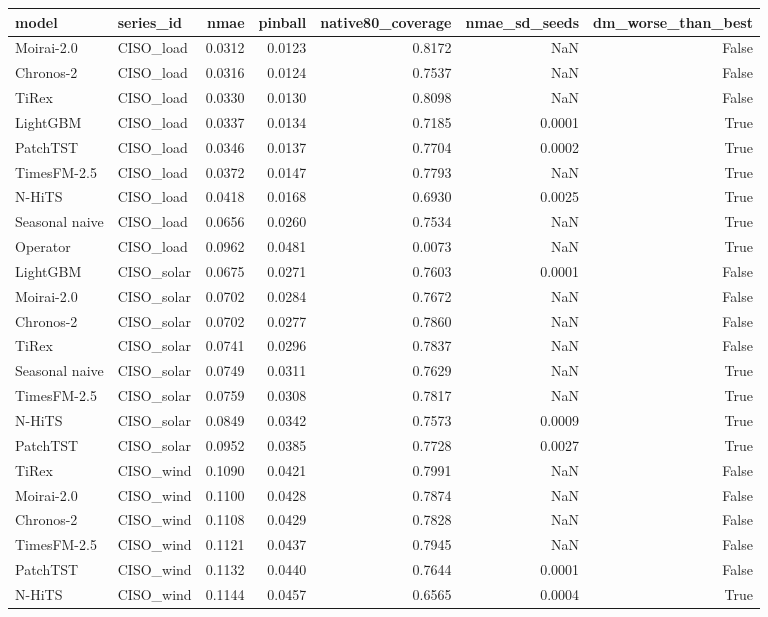\begin{tabular}{llrrrrr}
\toprule
model & series_id & nmae & pinball & native80_coverage & nmae_sd_seeds & dm_worse_than_best \\
\midrule
Moirai-2.0 & CISO_load & 0.0312 & 0.0123 & 0.8172 & NaN & False \\
Chronos-2 & CISO_load & 0.0316 & 0.0124 & 0.7537 & NaN & False \\
TiRex & CISO_load & 0.0330 & 0.0130 & 0.8098 & NaN & False \\
LightGBM & CISO_load & 0.0337 & 0.0134 & 0.7185 & 0.0001 & True \\
PatchTST & CISO_load & 0.0346 & 0.0137 & 0.7704 & 0.0002 & True \\
TimesFM-2.5 & CISO_load & 0.0372 & 0.0147 & 0.7793 & NaN & True \\
N-HiTS & CISO_load & 0.0418 & 0.0168 & 0.6930 & 0.0025 & True \\
Seasonal naive & CISO_load & 0.0656 & 0.0260 & 0.7534 & NaN & True \\
Operator & CISO_load & 0.0962 & 0.0481 & 0.0073 & NaN & True \\
LightGBM & CISO_solar & 0.0675 & 0.0271 & 0.7603 & 0.0001 & False \\
Moirai-2.0 & CISO_solar & 0.0702 & 0.0284 & 0.7672 & NaN & False \\
Chronos-2 & CISO_solar & 0.0702 & 0.0277 & 0.7860 & NaN & False \\
TiRex & CISO_solar & 0.0741 & 0.0296 & 0.7837 & NaN & False \\
Seasonal naive & CISO_solar & 0.0749 & 0.0311 & 0.7629 & NaN & True \\
TimesFM-2.5 & CISO_solar & 0.0759 & 0.0308 & 0.7817 & NaN & True \\
N-HiTS & CISO_solar & 0.0849 & 0.0342 & 0.7573 & 0.0009 & True \\
PatchTST & CISO_solar & 0.0952 & 0.0385 & 0.7728 & 0.0027 & True \\
TiRex & CISO_wind & 0.1090 & 0.0421 & 0.7991 & NaN & False \\
Moirai-2.0 & CISO_wind & 0.1100 & 0.0428 & 0.7874 & NaN & False \\
Chronos-2 & CISO_wind & 0.1108 & 0.0429 & 0.7828 & NaN & False \\
TimesFM-2.5 & CISO_wind & 0.1121 & 0.0437 & 0.7945 & NaN & False \\
PatchTST & CISO_wind & 0.1132 & 0.0440 & 0.7644 & 0.0001 & False \\
N-HiTS & CISO_wind & 0.1144 & 0.0457 & 0.6565 & 0.0004 & True \\

\end{tabular}
